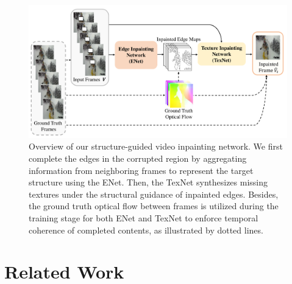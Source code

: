 

\begin{figure}[t]
	\centering
	\includegraphics[width=1.01\columnwidth]{pipeline} 
	\caption{Overview of our structure-guided video inpainting network. We first complete the edges in the corrupted region by aggregating information from neighboring frames to represent the target structure using the ENet. Then, the TexNet synthesizes missing textures under the structural guidance of inpainted edges. Besides, the ground truth optical flow between frames is utilized during the training stage for both ENet and TexNet to enforce temporal coherence of completed contents, as illustrated by dotted lines.}
	\label{fig:overview}
\end{figure}






\section{Related Work}

%


